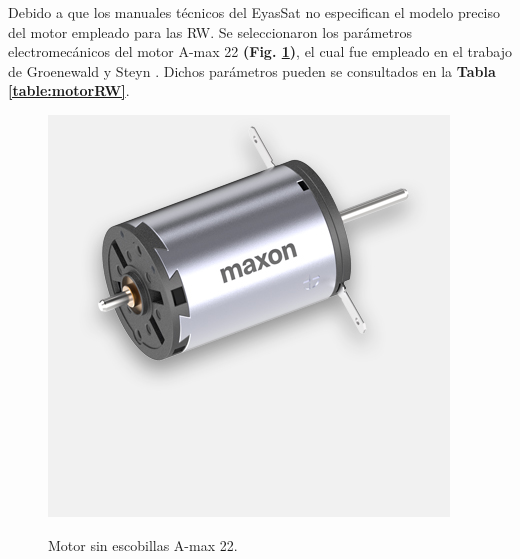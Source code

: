 Debido a que los manuales técnicos del EyasSat no especifican el modelo preciso del motor empleado para las RW. Se seleccionaron los parámetros electromecánicos del motor A-max 22 \textbf{(Fig. \ref{fig:motorRW})}, el cual fue empleado en el trabajo de Groenewald y Steyn \cite{Groenewald2014}. Dichos parámetros pueden se consultados en la \textbf{Tabla \ref{table:motorRW}}.


\begin{figure}[!ht]
	\begin{center}
		\includegraphics[scale=0.5]{imagenes/modelo_dinamico/motorRW.jpg}\\
	\end{center}
	\caption{Motor sin escobillas A-max 22\cite{maxon2023}.}
	\label{fig:motorRW}
\end{figure}

